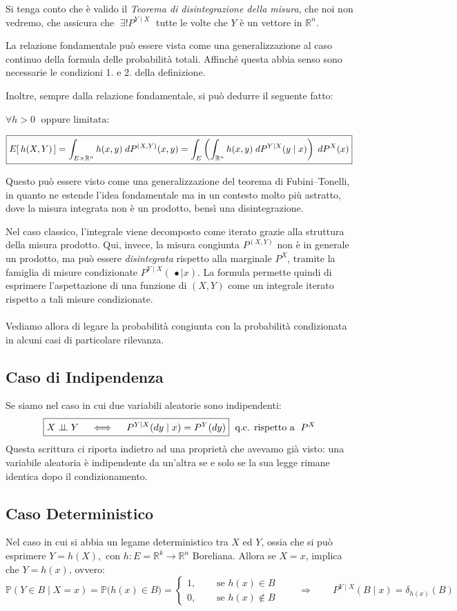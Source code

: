 \medskip
\noindent Si tenga conto che è valido il \textit{Teorema di disintegrazione della misura}, che noi non vedremo, che assicura che $\;\exists ! P^{Y\mid X}\;$ tutte le volte che $Y$ è  un vettore in $\mathbb{R}^n$.

\bigskip
\noindent La relazione fondamentale può essere vista come una generalizzazione al caso continuo della formula delle probabilità totali. Affinché questa abbia senso sono necessarie le condizioni 1. e 2. della definizione.

\bigskip
\noindent Inoltre, sempre dalla relazione fondamentale, si può dedurre il seguente fatto:

\medskip
\noindent $\forall h>0 \;\text{ oppure limitata}:$

\[\boxed{E\!\left[\,h(X, Y)\,\right] = \int_{E\times \mathbb{R}^n}h(x, y)\; dP^{(X, Y)}(x, y) = \int_E \left(\int_{\mathbb{R}^n}h(x, y)\;dP^{Y\mid X}(y\mid x)\right)\;dP^X(x)}\]

Questo può essere visto come una generalizzazione del teorema di Fubini--Tonelli, in quanto ne estende l’idea fondamentale ma in un contesto molto più astratto, dove la misura integrata non è un prodotto, bensì una disintegrazione.

\medskip
Nel caso classico, l'integrale viene decomposto come iterato grazie alla struttura della misura prodotto. Qui, invece, la misura congiunta $P^{(X,Y)}$ non è in generale un prodotto,
ma può essere \emph{disintegrata} rispetto alla marginale $P^X$, 
tramite la famiglia di misure condizionate $P^{Y\mid X}(\,\bullet\mid x)$.
La formula permette quindi di esprimere l'aspettazione di una funzione di $(X,Y)$ come un integrale iterato rispetto a tali misure condizionate.\\
\\
Vediamo allora di legare la probabilità congiunta con la probabilità condizionata in alcuni casi di particolare rilevanza.

\subsection{Caso di Indipendenza}
\label{cap:14.2.1}
Se siamo nel caso in cui due variabili aleatorie sono indipendenti:
\[\boxed{X\mathrel{\perp\!\!\!\perp} Y\quad \iff \quad P^{Y\mid X}(dy\mid x) = P^Y(dy)}\;\text{ q.c. rispetto a }\;P^X\]
Questa scrittura ci riporta indietro ad una proprietà che avevamo già visto: una variabile aleatoria è indipendente da un’altra se e solo se la sua legge rimane identica dopo il condizionamento.

\subsection{Caso Deterministico}
Nel caso in cui si abbia un legame deterministico tra $X$ ed $Y$, ossia che si può esprimere $Y=h(X), $ con $h:E = \mathbb{R}^k\to\mathbb{R}^n$ Boreliana. Allora se $X = x$, implica che $Y=h(x)$, ovvero:
\[\mathbb{P}(Y\in B\mid X=x) = \mathbb{P}\bigr(h(x) \in B\bigl) = \begin{cases}
    1, \quad &\text{ se } h(x)\in B\\
    0, \quad &\text{ se } h(x)\notin B
\end{cases}\qquad \Rightarrow \qquad \boxed{P^{Y\mid X}(B\mid x) = \delta_{h(x)}(B)}\]

